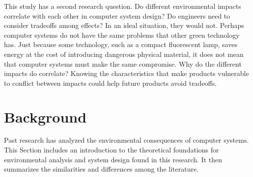 \documentclass[final,journal,10pt,letterpaper,oneside,twocolumn,compsoc]%
{IEEEtran}
\begin{document}


This study has a second research question. Do different environmental impacts
correlate with each other in computer system
design? Do engineers need to consider tradeoffs among effects? In an ideal
situation, they would not. Perhaps computer systems do not have the same
problems that other green technology has. Just because some technology, such as
a compact fluorescent lamp, saves energy at the cost of introducing dangerous
physical material, it
does not mean that computer systems must make the same compromise. Why do the
different impacts do correlate? Knowing the characteristics that make
products vulnerable to conflict between impacts could help future products avoid
tradeoffs.

\section{Background}
Past research has analyzed the
environmental consequences of computer systems. This
Section includes an
introduction to the theoretical foundations for environmental analysis and
system design found in this research. It then summarizes the similarities and
differences among the literature.
\end{document}
